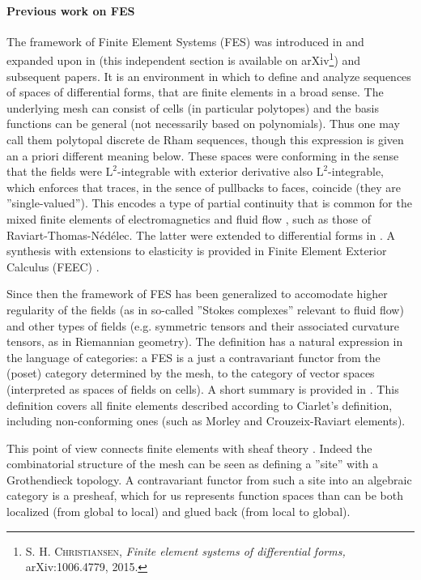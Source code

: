 \documentclass[10pt,a4paper]{article}
\newcommand{\rmL}{\mathrm{L}}
\theoremstyle{remark}
\theoremstyle{definition}
\numberwithin{equation}{section}
\begin{document}
\paragraph{Previous work on FES} The framework of Finite Element Systems (FES) was introduced in \cite{Chr08M3AS} and expanded upon in \cite[\S 5]{ChrMunOwr11} (this independent section is available on arXiv\footnote{\textsc{S. H. Christiansen,} \emph{Finite element systems of differential forms,} arXiv:1006.4779, 2015.}) and subsequent papers. It is an environment in which to define and analyze sequences of spaces of differential forms, that are finite elements in a broad sense. The underlying mesh can consist of cells (in particular polytopes) and the basis functions can be general (not necessarily based on polynomials). Thus one may call them polytopal discrete de Rham sequences, though this expression is given an a priori different meaning below. These spaces were conforming in the sense that the fields were $\rmL^2$-integrable with exterior derivative also $\rmL^2$-integrable, which enforces that traces, in the sence of pullbacks to faces, coincide (they are ''single-valued''). This encodes a type of partial continuity that is common for the mixed finite elements of electromagnetics and fluid flow \cite{BofBreFor13}, such as those of Raviart-Thomas-Nédélec. The latter were extended to differential forms in \cite{Hip99}. A synthesis with extensions to elasticity is provided in Finite Element Exterior Calculus (FEEC) \cite{ArnFalWin06}.

Since then the framework of FES has been generalized to accomodate higher regularity of the fields \cite{ChrHu18} (as in so-called ''Stokes complexes'' relevant to fluid flow) and other types of fields \cite{ChrHu23} (e.g. symmetric tensors and their associated curvature tensors, as in Riemannian geometry). The definition has a natural expression in the language of categories: a FES is a just a contravariant functor from the (poset) category determined by the mesh, to the category of vector spaces (interpreted as spaces of fields on cells). A short summary is provided in \cite{Chr22}. This definition covers all finite elements described according to Ciarlet's definition, including non-conforming ones (such as Morley and Crouzeix-Raviart elements).

This point of view connects finite elements with sheaf theory \cite{Ive86}. Indeed the combinatorial structure of the mesh can be seen as defining a ''site'' with a Grothendieck topology. A contravariant functor from such a site into an algebraic category is a presheaf, which for us represents function spaces than can be both localized (from global to local) and glued back (from local to global).
\end{document}
